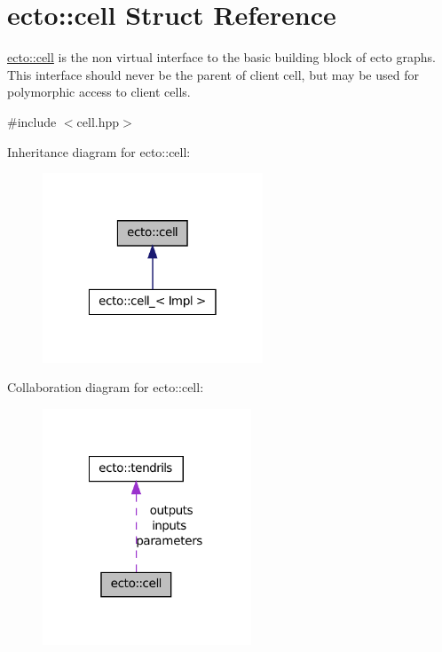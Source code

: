 \hypertarget{structecto_1_1cell}{\section{ecto\-:\-:cell \-Struct \-Reference}
\label{structecto_1_1cell}
}


\hyperlink{structecto_1_1cell}{ecto\-::cell} is the non virtual interface to the basic building block of ecto graphs. \-This interface should never be the parent of client cell, but may be used for polymorphic access to client cells.  




{\ttfamily \#include $<$cell.\-hpp$>$}



\-Inheritance diagram for ecto\-:\-:cell\-:\nopagebreak
\begin{figure}[H]
\begin{center}
\leavevmode
\includegraphics[width=186pt]{structecto_1_1cell__inherit__graph}
\end{center}
\end{figure}


\-Collaboration diagram for ecto\-:\-:cell\-:\nopagebreak
\begin{figure}[H]
\begin{center}
\leavevmode
\includegraphics[width=176pt]{structecto_1_1cell__coll__graph}
\end{center}
\end{figure}
